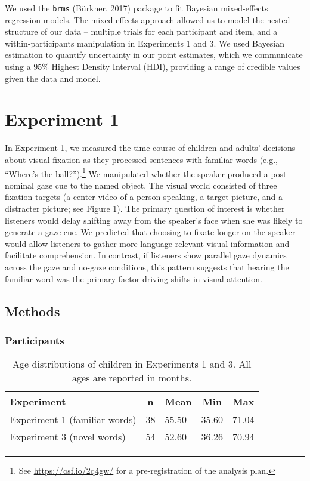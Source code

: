 \documentclass[man,floatsintext]{apa6}
\let\rmarkdownfootnote\footnote%
\def\footnote{\protect\rmarkdownfootnote}
\begin{document}
We used the \texttt{brms} (Bürkner, 2017) package to fit Bayesian
mixed-effects regression models. The mixed-effects approach allowed us
to model the nested structure of our data -- multiple trials for each
participant and item, and a within-participants manipulation in
Experiments 1 and 3. We used Bayesian estimation to quantify uncertainty
in our point estimates, which we communicate using a 95\% Highest
Density Interval (HDI), providing a range of credible values given the
data and model.

\section{Experiment 1}\label{experiment-1}

In Experiment 1, we measured the time course of children and adults'
decisions about visual fixation as they processed sentences with
familiar words (e.g., \enquote{Where's the ball?}).\footnote{See
  \url{https://osf.io/2q4gw/} for a pre-registration of the analysis
  plan.} We manipulated whether the speaker produced a post-nominal gaze
cue to the named object. The visual world consisted of three fixation
targets (a center video of a person speaking, a target picture, and a
distracter picture; see Figure 1). The primary question of interest is
whether listeners would delay shifting away from the speaker's face when
she was likely to generate a gaze cue. We predicted that choosing to
fixate longer on the speaker would allow listeners to gather more
language-relevant visual information and facilitate comprehension. In
contrast, if listeners show parallel gaze dynamics across the gaze and
no-gaze conditions, this pattern suggests that hearing the familiar word
was the primary factor driving shifts in visual attention.

\subsection{Methods}\label{methods}

\subsubsection{Participants}\label{participants}

\begin{table}[tbp]
\begin{center}
\begin{threeparttable}
\caption{\label{tab:make-ss-table}Age distributions of children in Experiments 1 and 3. All ages are reported in months.}
\begin{tabular}{lllll}
\toprule
Experiment & \multicolumn{1}{c}{n} & \multicolumn{1}{c}{Mean} & \multicolumn{1}{c}{Min} & \multicolumn{1}{c}{Max}\\
\midrule
Experiment 1 (familiar words) & 38 & 55.50 & 35.60 & 71.04\\
Experiment 3 (novel words) & 54 & 52.60 & 36.26 & 70.94\\
\bottomrule
\end{tabular}
\end{threeparttable}
\end{center}
\end{table}
\end{document}
